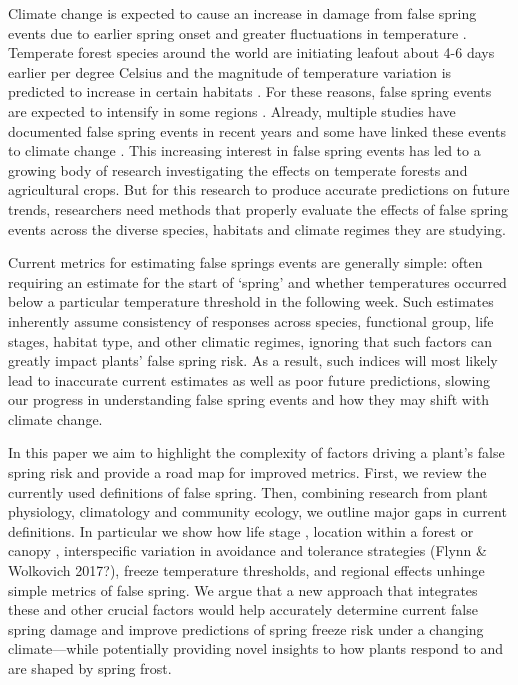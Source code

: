 \documentclass{article}\usepackage[]{graphicx}\usepackage[]{color}
\begin{document}
Climate change is expected to cause an increase in damage from false spring events due to earlier spring onset and greater fluctuations in temperature \citep{Cannell1986, Inouye2008, Martin2010}. Temperate forest species around the world are initiating leafout about 4-6 days earlier per degree Celsius \citep{Wolkovich2012, Polgar2014} and the magnitude of temperature variation is predicted to increase in certain habitats \citep{Thompson2013, Vasseur2014}. For these reasons, false spring events are expected to intensify in some regions \citep{Kodra2011, Allstadt2015}. Already, multiple studies have documented false spring events in recent years \citep{Gu2008, Augspurger2009, Knudson2012, Augspurger2013} and some have linked these events to climate change \citep{Ault2013, Allstadt2015, Muffler2016, Xin2016}. This increasing interest in false spring events has led to a growing body of research investigating the effects on temperate forests and agricultural crops. But for this research to produce accurate predictions on future trends, researchers need methods that properly evaluate the effects of false spring events across the diverse species, habitats and climate regimes they are studying. 

Current metrics for estimating false springs events are generally simple: often requiring an estimate for the start of `spring' and whether temperatures occurred below a particular temperature threshold in the following week. Such estimates inherently assume consistency of responses across species, functional group, life stages, habitat type, and other climatic regimes, ignoring that such factors can greatly impact plants' false spring risk. As a result, such indices will most likely lead to inaccurate current estimates as well as poor future predictions, slowing our progress in understanding false spring events and how they may shift with climate change. 

In this paper we aim to highlight the complexity of factors driving a plant's false spring risk and provide a road map for improved metrics. First, we review the currently used definitions of false spring. Then, combining research from plant physiology, climatology and community ecology, we outline major gaps in current definitions. In particular we show how life stage \citep{Caffarra2011}, location within a forest or canopy \citep{Augspurger2013}, interspecific variation in avoidance and tolerance strategies (Flynn \& Wolkovich 2017?), freeze temperature thresholds, and regional effects \citep{Martin2010} unhinge simple metrics of false spring. We argue that a new approach that integrates these and other crucial factors would help accurately determine current false spring damage and improve predictions of spring freeze risk under a changing climate---while potentially providing novel insights to how plants respond to and are shaped by spring frost. %
\end{document}
